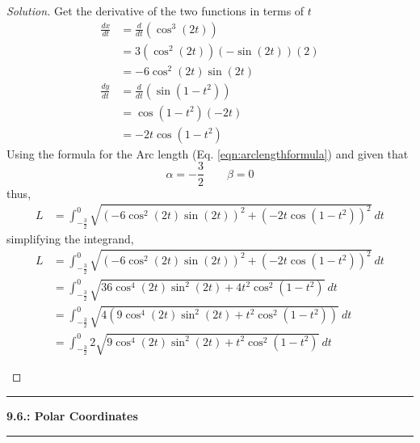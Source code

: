 \documentclass[12pt]{article}
\begin{document}
\begin{enumerate}[label=\arabic*.]
			\begin{proof}[Solution]
				Get the derivative of the two functions in terms of \(t\)
				\begin{align*}
					\frac{dx}{dt} & = \frac{d}{dt}\left(\cos^3(2t)\right) \\
					& = 3\left(\cos^2(2t)\right)\left(-\sin(2t)\right)(2) \\
					& = -6 \cos^2(2t)\sin(2t) \\
					\frac{dy}{dt} & = \frac{d}{dt}\left(\sin(1-t^2)\right) \\
					& = \cos\left(1-t^2\right)(-2t) \\
					& = -2t \cos\left(1-t^2\right)
				\end{align*}
				Using the formula for the Arc length (Eq. \ref{eqn:arclengthformula}) and given that 
				\[\alpha=-\frac{3}{2}\qquad \beta=0\]
				thus,
				\begin{align*}
					L & = \int_{-\frac{3}{2}}^0 \sqrt{\left(-6\cos^2(2t)\sin(2t)\right)^2+\left(-2t\cos\left(1-t^2\right)\right)^2}~dt
				\end{align*}
				simplifying the integrand,
				\begin{align*}
					L & = \int_{-\frac{3}{2}}^0 \sqrt{\left(-6\cos^2(2t)\sin(2t)\right)^2+\left(-2t\cos\left(1-t^2\right)\right)^2}~dt \\
					& = \int_{-\frac{3}{2}}^0 \sqrt{36\cos^4(2t)\sin^2(2t)+4t^2\cos^2\left(1-t^2\right)}~dt \\
					& = \int_{-\frac{3}{2}}^0 \sqrt{4\left(9\cos^4(2t)\sin^2(2t)+t^2\cos^2\left(1-t^2\right)\right)}~dt \\
					& = \int_{-\frac{3}{2}}^0 2\sqrt{9\cos^4(2t)\sin^2(2t)+t^2\cos^2\left(1-t^2\right)}~dt
				\end{align*}
				\begin{center}
				\end{center}
			\end{proof}
			\hrule
			
	
		\end{enumerate}
	
	\newpage
		\noindent
		{\Large \textbf{9.6.: Polar Coordinates}} \\
		\hrule
		
\end{document}
